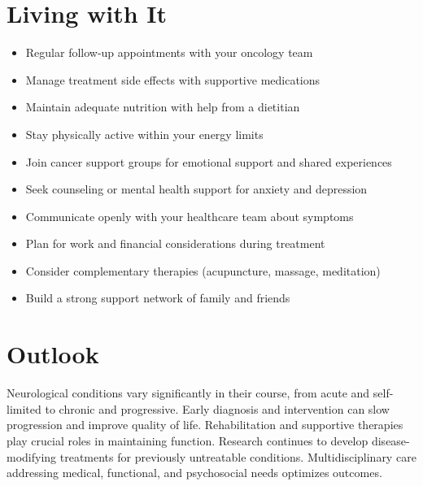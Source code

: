 \section{Living with It}
\begin{itemize}[noitemsep]
  \item Regular follow-up appointments with your oncology team
  \item Manage treatment side effects with supportive medications
  \item Maintain adequate nutrition with help from a dietitian
  \item Stay physically active within your energy limits
  \item Join cancer support groups for emotional support and shared experiences
  \item Seek counseling or mental health support for anxiety and depression
  \item Communicate openly with your healthcare team about symptoms
  \item Plan for work and financial considerations during treatment
  \item Consider complementary therapies (acupuncture, massage, meditation)
  \item Build a strong support network of family and friends
\end{itemize}
\section{Outlook}
Neurological conditions vary significantly in their course, from acute and self-limited to chronic and progressive. Early diagnosis and intervention can slow progression and improve quality of life. Rehabilitation and supportive therapies play crucial roles in maintaining function. Research continues to develop disease-modifying treatments for previously untreatable conditions. Multidisciplinary care addressing medical, functional, and psychosocial needs optimizes outcomes.
